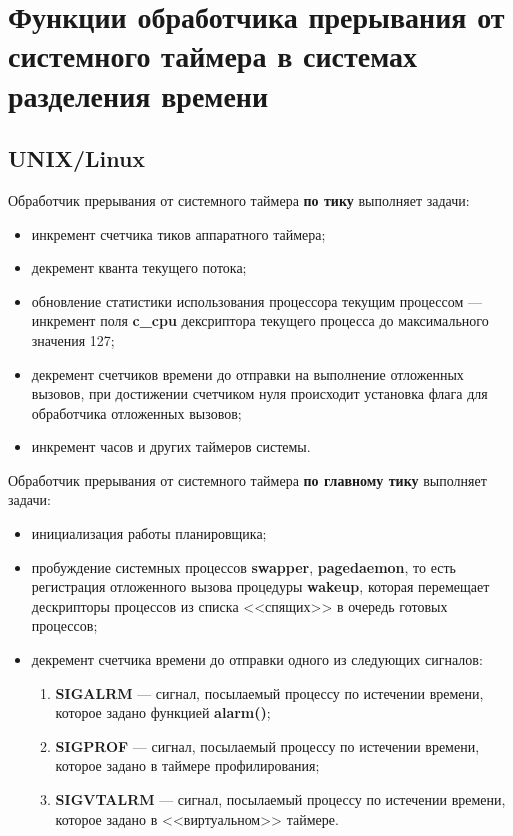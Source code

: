 \chapter{Функции обработчика прерывания от системного таймера в системах разделения времени}

\section{UNIX/Linux}

Обработчик прерывания от системного таймера \textbf{по тику} выполняет задачи:
\begin{itemize}
	\item инкремент счетчика тиков аппаратного таймера;
	\item декремент кванта текущего потока;
	\item обновление статистики использования процессора текущим процессом --- инкремент поля \textbf{c\_cpu} дексриптора текущего процесса до максимального значения 127;
	\item декремент счетчиков времени до отправки на выполнение отложенных вызовов, при достижении счетчиком нуля происходит установка флага для обработчика отложенных вызовов;
	\item инкремент часов и других таймеров системы.
\end{itemize}

Обработчик прерывания от системного таймера \textbf{по главному тику} выполняет задачи:
\begin{itemize}
	\item инициализация работы планировщика;
	\item пробуждение системных процессов \textbf{swapper}, \textbf{pagedaemon}, то есть регистрация отложенного вызова процедуры \textbf{wakeup}, которая перемещает дескрипторы процессов из списка <<спящих>> в очередь готовых процессов;
	\item декремент счетчика времени до отправки одного из следующих сигналов:
	\begin{enumerate}
		\item \textbf{SIGALRM} --- сигнал, посылаемый процессу по истечении времени, которое задано функцией \textbf{alarm()};
		\item \textbf{SIGPROF} --- сигнал, посылаемый процессу по истечении времени, которое задано в таймере профилирования;
		\item \textbf{SIGVTALRM} --- сигнал, посылаемый процессу по истечении времени, которое задано в <<виртуальном>> таймере.
	\end{enumerate}
\end{itemize}

